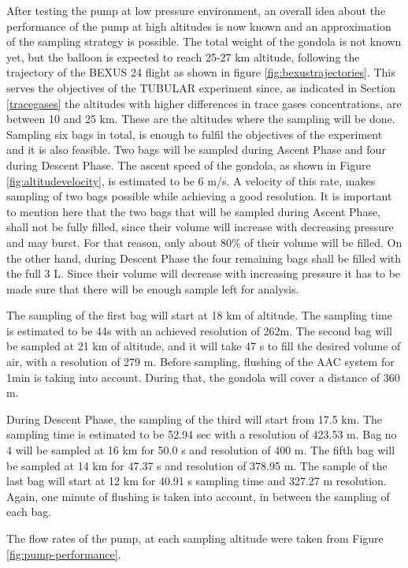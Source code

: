 After testing the pump at low pressure environment, an overall idea about the performance of the pump at high altitudes is now known and an approximation of the sampling strategy is possible.   
The total weight of the gondola is not known yet, but the balloon is expected to reach 25-27 km altitude, following the trajectory of the BEXUS 24 flight as shown in figure \ref{fig:bexustrajectories}. 
This serves the objectives of the TUBULAR experiment since, as indicated in Section \ref{tracegases} the altitudes with higher differences in trace gases concentrations, are between 10 and 25 km. These are the altitudes where the sampling will be done. Sampling six bags in total, is enough to fulfil the objectives of the experiment and it is also feasible. Two bags will be sampled during Ascent Phase and four during Descent Phase. The ascent speed of the gondola, as shown in Figure \ref{fig:altitudevelocity}, is estimated to be 6 m/s. A velocity of this rate, makes sampling of two bags possible while achieving a good resolution. It is important to mention here that the two bags that will be sampled during Ascent Phase, shall not be fully filled, since their volume will increase with decreasing pressure and may burst. For that reason, only about 80\% of their volume will be filled. On the other hand, during Descent Phase the four remaining bags shall be filled with the full 3 L. Since their volume will decrease with increasing pressure it has to be made sure that there will be enough sample left for analysis. 

The sampling of the first bag will start at 18 km of altitude. The sampling time is estimated to be 44s with an achieved resolution of 262m. The second bag will be sampled at 21 km of altitude, and it will take 47 s to fill the desired volume of air, with a resolution of 279 m. Before sampling, flushing of the AAC system for 1min is taking into account. During that, the gondola will cover a distance of 360 m. 

During Descent Phase, the sampling of the third will start from 17.5 km. The sampling time is estimated to be 52.94 sec with a resolution of 423.53 m. Bag no 4 will be sampled at 16 km for 50.0 s and resolution of 400 m. The fifth bag will be sampled at 14 km for 47.37 s and resolution of 378.95 m. The sample of the last bag will start at 12 km for 40.91 s sampling time and 327.27 m resolution. Again, one minute of flushing is taken into account, in between the sampling of each bag.

The flow rates of the pump, at each sampling altitude were taken from Figure \ref{fig:pump-performance}.




